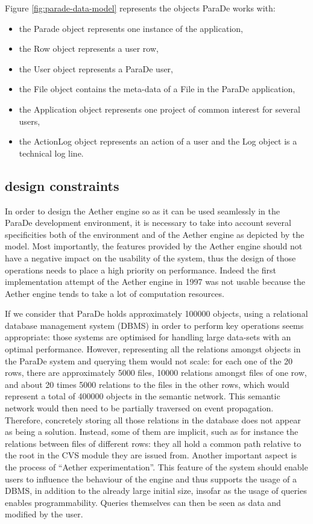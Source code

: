 \documentclass{ecscw2007}
\begin{document}
Figure \ref{fig:parade-data-model} represents the objects ParaDe works with:
\begin{itemize}
	\item the Parade object represents one instance of the application,
	\item the Row object represents a user row,
	\item the User object represents a ParaDe user,
	\item the File object contains the meta-data of a File in the ParaDe application,
	\item the Application object represents one project of common interest for several users,
	\item the ActionLog object represents an action of a user and the Log object is a technical log line.
\end{itemize}


\subsection*{design constraints}

In order to design the Aether engine so as it can be used seamlessly in the ParaDe development environment, it is necessary to take into account several specificities both of the environment and of the Aether engine as depicted by the model.
Most importantly, the features provided by the Aether engine should not have a negative impact on the usability of the system, thus the design of those operations needs to place a high priority on performance. Indeed the first implementation attempt of the Aether engine in 1997 was not usable because the Aether engine tends to take a lot of computation resources.

If we consider that ParaDe holds approximately 100000 objects, using a relational database management system (DBMS) in order to perform key operations seems appropriate: those systems are optimised for handling large data-sets with an optimal performance. However, representing all the relations amongst objects in the ParaDe system and querying them would not scale: for each one of the 20 rows, there are approximately 5000 files, 10000 relations amongst files of one row, and about 20 times 5000 relations to the files in the other rows, which would represent a total of 400000 objects in the semantic network. This semantic network would then need to be partially traversed on event propagation. Therefore, concretely storing all those relations in the database does not appear as being a solution. Instead, some of them are implicit, such as for instance the relations between files of different rows: they all hold a common path relative to the root in the CVS module they are issued from.
Another important aspect is the process of ``Aether experimentation''. This feature of the system should enable users to influence the behaviour of the engine and thus supports the usage of a DBMS, in addition to the already large initial size, insofar as the usage of queries enables programmability. Queries themselves can then be seen as data and modified by the user.
\end{document}

